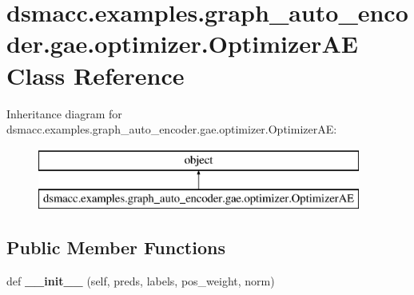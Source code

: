 \hypertarget{classdsmacc_1_1examples_1_1graph__auto__encoder_1_1gae_1_1optimizer_1_1OptimizerAE}{}\section{dsmacc.\+examples.\+graph\+\_\+auto\+\_\+encoder.\+gae.\+optimizer.\+Optimizer\+AE Class Reference}
\label{classdsmacc_1_1examples_1_1graph__auto__encoder_1_1gae_1_1optimizer_1_1OptimizerAE}
Inheritance diagram for dsmacc.\+examples.\+graph\+\_\+auto\+\_\+encoder.\+gae.\+optimizer.\+Optimizer\+AE\+:\begin{figure}[H]
\begin{center}
\leavevmode
\includegraphics[height=2.000000cm]{classdsmacc_1_1examples_1_1graph__auto__encoder_1_1gae_1_1optimizer_1_1OptimizerAE}
\end{center}
\end{figure}
\subsection*{Public Member Functions}
\begin{DoxyCompactItemize}
\item 
\mbox{\label{classdsmacc_1_1examples_1_1graph__auto__encoder_1_1gae_1_1optimizer_1_1OptimizerAE_ade2b698c5855848f00e5a7fe9e9964bd}} 
def {\bfseries \+\_\+\+\_\+init\+\_\+\+\_\+} (self, preds, labels, pos\+\_\+weight, norm)
\end{DoxyCompactItemize}

